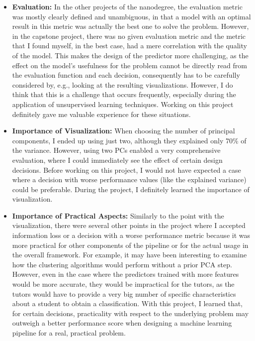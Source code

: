 \begin{itemize}
	\item \textbf{Evaluation:} In the other projects of the nanodegree, the evaluation metric was mostly clearly defined and unambiguous, in that a model with an optimal result in this metric was actually the best one to solve the problem. However, in the capstone project, there was no given evaluation metric and the metric that I found myself, in the best case, had a mere correlation with the quality of the model. This makes the design of the predictor more challenging, as the effect on the model's usefulness for the problem cannot be directly read from the evaluation function and each decision, consequently has to be carefully considered by, e.g., looking at the resulting visualizations. However, I do think that this is a challenge that occurs frequently, especially during the application of unsupervised learning techniques. Working on this project definitely gave me valuable experience for these situations.
	\item \textbf{Importance of Visualization:} When choosing the number of principal components, I ended up using just two, although they explained only 70\% of the variance. However, using two PCs enabled a very comprehensive evaluation, where I could immediately see the effect of certain design decisions. Before working on this project, I would not have expected a case where a decision with worse performance values (like the explained variance) could be preferable. During the project, I definitely learned the importance of visualization. 
	\item \textbf{Importance of Practical Aspects:} Similarly to the point with the visualization, there were several other points in the project where I accepted information loss or a decision with a worse performance metric because it was more practical for other components of the pipeline or for the actual usage in the overall framework. For example, it may have been interesting to examine how the clustering algorithms would perform without a prior PCA step. However, even in the case where the predictors trained with more features would be more accurate, they would be impractical for the tutors, as the tutors would have to provide a very big number of specific characteristics about a student to obtain a classification. With this project, I learned that, for certain decisions, practicality with respect to the underlying problem may outweigh a better performance score when designing a machine learning pipeline for a real, practical problem.
\end{itemize}

